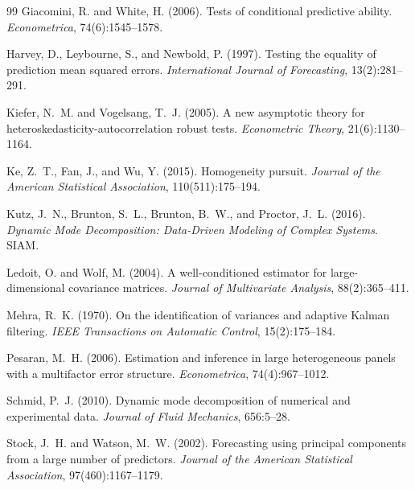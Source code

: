 \documentclass[11pt,a4paper]{article}
\begin{document}
\begin{thebibliography}{99}
Giacomini, R. and White, H. (2006).
\newblock Tests of conditional predictive ability.
\newblock \emph{Econometrica}, 74(6):1545--1578.

Harvey, D., Leybourne, S., and Newbold, P. (1997).
\newblock Testing the equality of prediction mean squared errors.
\newblock \emph{International Journal of Forecasting}, 13(2):281--291.

Kiefer, N.~M. and Vogelsang, T.~J. (2005).
\newblock A new asymptotic theory for heteroskedasticity-autocorrelation robust tests.
\newblock \emph{Econometric Theory}, 21(6):1130--1164.

Ke, Z.~T., Fan, J., and Wu, Y. (2015).
\newblock Homogeneity pursuit.
\newblock \emph{Journal of the American Statistical Association}, 110(511):175--194.

Kutz, J.~N., Brunton, S.~L., Brunton, B.~W., and Proctor, J.~L. (2016).
\newblock \emph{Dynamic Mode Decomposition: Data-Driven Modeling of Complex Systems}.
\newblock SIAM.

Ledoit, O. and Wolf, M. (2004).
\newblock A well-conditioned estimator for large-dimensional covariance matrices.
\newblock \emph{Journal of Multivariate Analysis}, 88(2):365--411.

Mehra, R.~K. (1970).
\newblock On the identification of variances and adaptive Kalman filtering.
\newblock \emph{IEEE Transactions on Automatic Control}, 15(2):175--184.

Pesaran, M.~H. (2006).
\newblock Estimation and inference in large heterogeneous panels with a multifactor error structure.
\newblock \emph{Econometrica}, 74(4):967--1012.

Schmid, P.~J. (2010).
\newblock Dynamic mode decomposition of numerical and experimental data.
\newblock \emph{Journal of Fluid Mechanics}, 656:5--28.

Stock, J.~H. and Watson, M.~W. (2002).
\newblock Forecasting using principal components from a large number of predictors.
\newblock \emph{Journal of the American Statistical Association}, 97(460):1167--1179.


\end{thebibliography}
\end{document}
